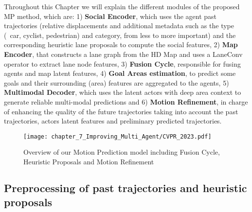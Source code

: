 Throughout this Chapter we will explain the different modules of the proposed \ac{MP} method, which are: 1) \textbf{Social Encoder}, which uses the agent past trajectories (relative displacements and additional metadata such as the type (\eg \ car, cyclist, pedestrian) and category, from less to more important) and the corresponding heuristic lane proposals to compute the social features, 2) \textbf{Map Encoder}, that constructs a lane graph from the HD Map and uses a LaneConv operator \cite{liang2020learning} to extract lane node features, 3) \textbf{Fusion Cycle}, responsible for fusing agents and map latent features, 4) \textbf{Goal Areas estimation}, to predict some goals and their surrounding  (area) features are aggregated to the agents, 5) \textbf{Multimodal Decoder}, which uses the latent actors with deep area context to generate reliable multi-modal predictions and 6) \textbf{Motion Refinement}, in charge of enhancing the quality of the future trajectories taking into account the past trajectories, actors latent features and preliminary predicted trajectories.

\begin{figure}[h] 
	\centering
	\texttt{[image: chapter\_7\_Improving\_Multi\_Agent/CVPR\_2023.pdf]}
	\caption{Overview of our Motion Prediction model including Fusion Cycle, Heuristic Proposals and Motion Refinement}
	\label{fig:chapter_7_Improving_Multi_Agent/CVPR_2023}
\end{figure}

\subsection{Preprocessing of past trajectories and heuristic proposals}
\label{subsec:7_improving_efficiency_preprocessing}

